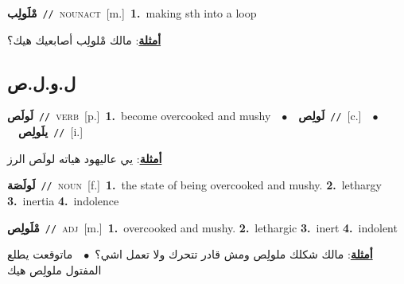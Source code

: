 \documentclass[10pt,a4paper,twoside]{article} %
\begin{document}
\begin{multicols}{2}
{\setlength\topsep{0pt}\textbf{\foreignlanguage{arabic}{مْلَولِب}}\ {\color{gray}\texttt{//}\color{black}}\ \textsc{noun\textunderscore act}\ [m.]\ \textbf{1.}~making sth into a loop\  \begin{flushright}\color{gray}\foreignlanguage{arabic}{\textbf{\underline{\foreignlanguage{arabic}{أمثلة}}}: مالك مْلولِب أصابعيك هيك؟}\end{flushright}\color{black}} \vspace{2mm}

\vspace{-3mm}
\subsection*{\color{blue}\foreignlanguage{arabic}{ل.و.ل.ص}\color{blue}{}} 

{\setlength\topsep{0pt}\textbf{\foreignlanguage{arabic}{لَولَص}}\ {\color{gray}\texttt{//}\color{black}}\ \textsc{verb}\ [p.]\ \textbf{1.}~become overcooked and mushy\ \ $\bullet$\ \ \setlength\topsep{0pt}\textbf{\foreignlanguage{arabic}{لَولِص}}\ {\color{gray}\texttt{//}\color{black}}\ [c.]\ \ $\bullet$\ \ \setlength\topsep{0pt}\textbf{\foreignlanguage{arabic}{يلَولِص}}\ {\color{gray}\texttt{//}\color{black}}\ [i.]\  \begin{flushright}\color{gray}\foreignlanguage{arabic}{\textbf{\underline{\foreignlanguage{arabic}{أمثلة}}}: يي عاليهود هياته لولَص الرز}\end{flushright}\color{black}} \vspace{2mm}

{\setlength\topsep{0pt}\textbf{\foreignlanguage{arabic}{لَولَصَة}}\ {\color{gray}\texttt{//}\color{black}}\ \textsc{noun}\ [f.]\ \textbf{1.}~the state of being overcooked and mushy.  \textbf{2.}~lethargy  \textbf{3.}~inertia  \textbf{4.}~indolence\ } \vspace{2mm}

{\setlength\topsep{0pt}\textbf{\foreignlanguage{arabic}{مْلَولِص}}\ {\color{gray}\texttt{//}\color{black}}\ \textsc{adj}\ [m.]\ \textbf{1.}~overcooked and mushy.  \textbf{2.}~lethargic  \textbf{3.}~inert  \textbf{4.}~indolent\  \begin{flushright}\color{gray}\foreignlanguage{arabic}{\textbf{\underline{\foreignlanguage{arabic}{أمثلة}}}: مالك شكلك ملولِص ومش قادر تتحرك ولا تعمل اشي؟\ $\bullet$\ \  ماتوقعت يطلع المفتول ملولِص هيك}\end{flushright}\color{black}} \vspace{2mm}


\end{multicols}
\end{document}

